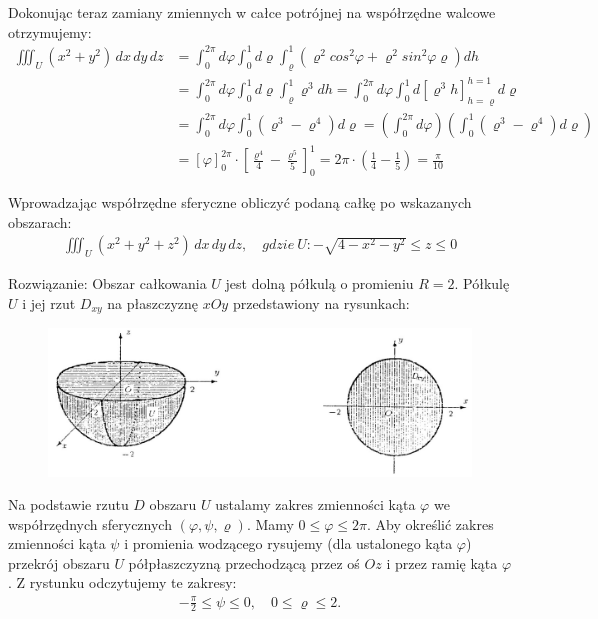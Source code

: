 \documentclass[12pt]{article}
\begin{document}
    Dokonując teraz zamiany zmiennych w całce potrójnej na współrzędne walcowe otrzymujemy:
    \begin{align*}
        \iiint_U (x^2+y^2) \,dx\,dy\,dz &= \int_{0}^{2\pi} d\varphi \int_{0}^{1} d\varrho \int_{\varrho}^{1} (\varrho^2 cos^2\varphi+\varrho^2sin^2\varphi \varrho) dh
        \\ &= \int_{0}^{2\pi} d\varphi \int_{0}^{1} d\varrho \int_{\varrho}^{1} \varrho^3 dh = \int_{0}^{2\pi} d\varphi \int_{0}^{1} d \left[ \varrho^3 h \right]_{h=\varrho}^{h=1} d\varrho
        \\ &= \int_{0}^{2\pi} d\varphi \int_{0}^{1} (\varrho^3 - \varrho^4) d\varrho  = \left(\int_{0}^{2\pi}d\varphi\right) \left( \int_{0}^{1} (\varrho^3 - \varrho^4) d\varrho\right)
        \\ &= \left[\varphi\right]_0^{2\pi} \cdot \left[\frac{\varrho^4}{4} - \frac{\varrho^5}{5}\right]_0^1 = 2\pi \cdot \left(\frac{1}{4}-\frac{1}{5}\right) = \frac{\pi}{10}
    \end{align*}


    \begin{exercise}
        Wprowadzając współrzędne sferyczne obliczyć podaną całkę po wskazanych obszarach:
        \begin{align*}
            \iiint_U (x^2+y^2+z^2) \,dx\,dy\,dz, \quad gdzie \ U: -\sqrt{4-x^2-y^2} \leq z \leq 0
        \end{align*}
    \end{exercise}
    Rozwiązanie:
    Obszar całkowania $U$ jest dolną półkulą o promieniu $R=2$. Półkulę $U$ i jej rzut $D_{xy}$ na płaszczyznę $xOy$ przedstawiony na rysunkach:

    \begin{figure}[H]
        \includegraphics[width=\linewidth]{28_2a.jpg}
    \end{figure}

    Na podstawie rzutu $D$ obszaru $U$ ustalamy zakres zmienności kąta $\varphi$ we współrzędnych sferycznych $(\varphi, \psi, \varrho)$. Mamy $0 \leq \varphi \leq 2\pi$. Aby określić zakres zmienności kąta $\psi$ i promienia wodzącego rysujemy (dla ustalonego kąta $\varphi$) przekrój obszaru $U$ półpłaszczyzną przechodzącą przez oś $Oz$ i przez ramię kąta $\varphi$. Z rystunku odczytujemy te zakresy:
    \begin{align*}
        -\frac{\pi}{2} \leq \psi \leq 0, \quad 0 \leq \varrho \leq 2.
    \end{align*}
\end{document}
